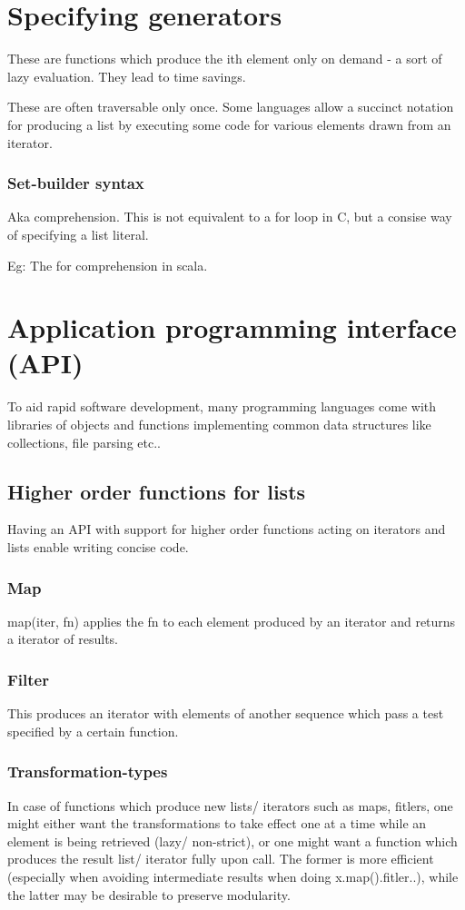 \documentclass[oneside, article]{memoir}
\begin{document}
\section{Specifying generators}
These are functions which produce the ith element only on demand -  a sort of lazy evaluation. They lead to time savings.

These are often traversable only once. Some languages allow a succinct notation for producing a list by executing some code for various elements drawn from an iterator. 

\subsubsection{Set-builder syntax}
Aka comprehension. This is not equivalent to a for loop in C, but a consise way of specifying a list literal.

Eg: The for comprehension in scala. 


\section{Application programming interface (API)}
To aid rapid software development, many programming languages come with libraries of objects and functions implementing common data structures like collections, file parsing etc..


\subsection{Higher order functions for lists}
Having an API with support for higher order functions acting on iterators and lists enable writing concise code.

\subsubsection{Map}
map(iter, fn) applies the fn to each element produced by an iterator and returns a iterator of results.

\subsubsection{Filter}
This produces an iterator with elements of another sequence which pass a test specified by a certain function.

\subsubsection{Transformation-types}
In case of functions which produce new lists/ iterators such as maps, fitlers, one might either want the transformations to take effect one at a time while an element is being retrieved (lazy/ non-strict), or one might want a function which produces the result list/ iterator fully upon call. The former is more efficient (especially when avoiding intermediate results when doing x.map().fitler..), while the latter may be desirable to preserve modularity.
\end{document}
